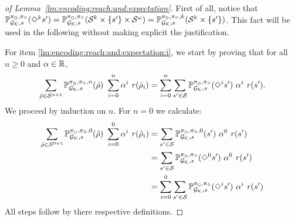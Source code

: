 \begin{proof}[of Lemma~\ref{lm:encoding:reach:and:expectation}]
  First of all, notice that
  $\mathbb{P}^{\pi_{{\Box}},\pi_{{\Diamond}}}_{{\mathcal{G}_{\mathcal{K}}},s}(\Diamond^k s') =
  \mathbb{P}^{\pi_{{\Box}},\pi_{{\Diamond}}}_{{\mathcal{G}_{\mathcal{K}}},s}(\mathcal{S}^k\times\{s'\}\times\mathcal{S}^\omega)
  =
  \mathbb{P}^{\pi_{{\Box}},\pi_{{\Diamond}},k}_{{\mathcal{G}_{\mathcal{K}}},s}(\mathcal{S}^k\times\{s'\})$.
  This fact will be used in the following without making explicit the
  justification.


  For item \ref{lm:encoding:reach:and:expectation:i}, we start by
  proving that for all $n\geq 0$ and $\alpha\in\mathbb{R}$,
  \begin{equation}\label{eq:encoding:reach:and:expectation:i:prel}
    \sum_{\hat{\rho} \in \mathcal{S}^{n+1}} \mathbb{P}^{\pi_{{\Box}},\pi_{{\Diamond}},n}_{{\mathcal{G}_{\mathcal{K}}},s}(\hat{\rho})\ \sum^{n}_{i=0}\alpha^i\ \mathit{r}(\hat{\rho}_i)
    =
    \sum^{n}_{i=0} \sum_{s' \in \mathcal{S}} \mathbb{P}^{\pi_{{\Box}},\pi_{{\Diamond}}}_{{\mathcal{G}_{\mathcal{K}}},s}(\Diamond^i s')\ \alpha^i\ \mathit{r}(s').
  \end{equation}
  We proceed by induction on $n$. For $n=0$ we calculate:
  \begin{align*}
    \sum_{\hat{\rho} \in \mathcal{S}^{0+1}} \mathbb{P}^{\pi_{{\Box}},\pi_{{\Diamond}},0}_{{\mathcal{G}_{\mathcal{K}}},s}(\hat{\rho})\ \sum^{0}_{i=0}\alpha^i\ \mathit{r}(\hat{\rho}_i)
    & =
    \sum_{s' \in \mathcal{S}} \mathbb{P}^{\pi_{{\Box}},\pi_{{\Diamond}},0}_{{\mathcal{G}_{\mathcal{K}}},s}(s')\ \alpha^0\ \mathit{r}(s') \\
    & =
    \sum_{s' \in \mathcal{S}} \mathbb{P}^{\pi_{{\Box}},\pi_{{\Diamond}}}_{{\mathcal{G}_{\mathcal{K}}},s}(\Diamond^0s')\ \alpha^0\ \mathit{r}(s') \\
    & =
    \sum^{0}_{i=0} \sum_{s' \in \mathcal{S}} \mathbb{P}^{\pi_{{\Box}},\pi_{{\Diamond}}}_{{\mathcal{G}_{\mathcal{K}}},s}(\Diamond^i s')\ \alpha^i\ \mathit{r}(s')
  \end{align*}
  All steps follow by there respective definitions.


\end{proof}
